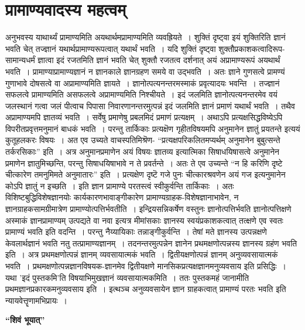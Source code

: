 {\section*{प्रामाण्यवादस्य महत्वम्}

अनुभवस्य याथार्थ्यं प्रामाण्यमिति अयथार्थमप्रामाण्यमिति व्यवह्रियते~। शुक्तिं दृष्ट्वा इयं शुक्तिरिति ज्ञानं भवति चेत् तज्ज्ञानं यथार्थप्रामाण्यरूपत्वात् यथार्थं भवति~। यदि शुक्तिं दृष्ट्वा शुक्तौप्रकाशकत्वादिरूप-सामान्यधर्मं ज्ञात्वा इदं रजतमिति ज्ञानं भवति चेत् शुक्तौ रजतत्व दर्शनात् अयं अप्रामाण्यरूपं अयथार्थं भवति~। प्रामाण्याप्रामाण्यज्ञानं न ज्ञानकाले ज्ञानग्रहण समये वा उद्भवति~। अतः ज्ञाने गुणसत्वे प्रामण्यं गुणाभावे दोषसत्वे वा अप्रामाण्यमिति ज्ञायते~। ज्ञानोत्पत्यनन्तरमस्माकं प्रवृत्यादयः भवन्ति~। तज्ज्ञानं सफलत्वे प्रामाण्यमिति असफलत्वे अप्रामाण्यमिति निश्चीयते~। इदं जलमिति ज्ञानोत्पत्यनन्तरमेव वयं जलस्थानं गत्वा जलं पीत्वाच पिपासा निवारणानन्तरमुत्पन्नं इदं जलमिति ज्ञानं प्रमाणं यथार्थं भवति~। तथैव अप्रामाण्यमपि ज्ञातव्यं भवति~। सर्वेषु प्रमाणेषु प्रबलमिदं प्रमाणं प्रत्यक्षम्~। अथाऽपि प्रत्यक्षसिद्धविष्येऽपि विपरीतप्रवृत्तमनुमानं बाधकं भवति~। परन्तु तार्किकाः प्रत्यक्षॆण गृहीतविषयमपि अनुमानेन ज्ञातुं प्रयतन्ते इत्ययं कुतूहलकरः विषयः~। अत एव उच्यते वाचस्पतिमिश्रॆण- “प्रत्यक्षपरिकलितमप्यर्थम् अनुमानेन बुबुत्सन्ते तर्करसिकाः” इति~। अत्र अनुमानप्रमाणेन अयं विषयः ज्ञातव्य इत्यात्मिका सिषाधयिषासत्वे अनुमानेन प्रमाणेन ज्ञातुमिच्छन्ति, परन्तु सिषाधयिषाभावे न ते प्रवर्तन्ते~। अतः ते एव उच्यन्ते “न हि करिणि दृष्टे चीत्कारेण तमनुमिमते अनुमातारः” इति~। प्रत्यक्षेण दृष्टॆ गजे पुनः चीत्कारश्रवणेन अयं गज इत्यनुमानेन कोऽपि ज्ञातुं न इच्छति~। इति ज्ञान प्रामाण्ये परतस्त्वं स्वीकुर्वन्ति तार्किकाः~। अतः विशिष्टबुद्धिविशेषज्ञानयोः कार्यकारणभावाङ्गीकारेण प्रामाण्यग्राहक-विशेषज्ञानाभावेन, न ज्ञानग्राहकसामग्रीमात्रेण प्रामाण्योत्पत्तिर्भवतीति~। इन्द्रियसन्निकर्षेण वस्तुनः ज्ञानोत्पत्तिर्भवति ज्ञानोत्पत्तिक्षणे अस्माकं ज्ञानप्रामाण्यम् उत्पद्यते वा नवा इत्यत्र मीमांसकाः ज्ञानस्य स्वयंप्रकाशकत्वात् तत्क्षणे एव स्वतः प्रामाण्यं भवति इति वदन्ति~। परन्तु नैय्यायिकाः तन्नाङ्गीकुर्वन्ति~। तेषां मते ज्ञानस्य उत्पन्नक्षणे केवलार्थज्ञानं भवति नतु तत्प्रामाण्यज्ञानम्~। तदनन्तरमुत्पन्नेन ज्ञानेन प्रथमक्षणोत्पन्नस्य ज्ञानस्य ग्रहंण भवति इति~। अत्र प्रथमक्षणोत्पन्नं ज्ञानम् व्यवसायात्मकं भवति~। द्वितीयक्षणोत्पन्नं ज्ञानम् अनुव्यवसायात्मकं भवति~। प्रथमक्षणोत्पन्नज्ञानविषयक-ज्ञानमेव द्वितीयक्षणे मानसिकप्रत्यक्षज्ञानमनुव्यवसाय इति प्रसिद्धिः~। यथा ’इदं पुस्तकमि’ति विषयाभिमुखज्ञानं व्यवसायात्मकमिति~। ततः पुस्तकमहं जानामीति प्रथमज्ञानप्रकारकमनुव्यवसाय इति~। इत्थञ्च अनुव्यवसायेन ज्ञान ग्राहकत्वात् प्रामाण्यं परतः भवति इति न्यायवेत्तॄणामभिप्रायः~। 
\begin{center}
\textbf{“शिवं भूयात्”}
\end{center}
}
